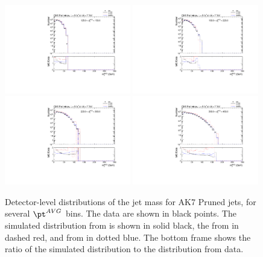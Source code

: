\begin{figure}[htbp]
\centering
\includegraphics[width=0.49\textwidth]{figs/histAK7MjetVsPtAvg_rawDataMCComparisons_pt_2_Pruned}
\includegraphics[width=0.49\textwidth]{figs/histAK7MjetVsPtAvg_rawDataMCComparisons_pt_3_Pruned}
\includegraphics[width=0.49\textwidth]{figs/histAK7MjetVsPtAvg_rawDataMCComparisons_pt_4_Pruned}
\includegraphics[width=0.49\textwidth]{figs/histAK7MjetVsPtAvg_rawDataMCComparisons_pt_5_Pruned}
\caption{Detector-level distributions of the jet mass for AK7 Pruned jets,
for several $\pt^{AVG}$ bins. The data are shown in black points.
The simulated distribution from \PYTHIA is shown in solid black, 
the from \PYTHIAEIGHT in dashed red, and from \HERWIG in dotted blue. 
The bottom frame shows the ratio of the simulated distribution
to the distribution from data. 
\label{figs:histAK7MjetVsPtAvg_rawDataMCComparisons_pt_2_Pruned}}
\end{figure}


